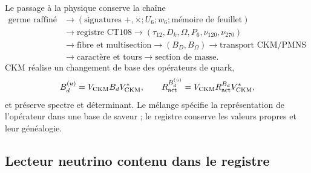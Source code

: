 Le passage à la physique conserve la chaîne
\begin{equation}
 \begin{aligned}
 \text{germe raffiné}
 &\longrightarrow(\text{signatures }+,\times;U_6;w_6;
                   \text{mémoire de feuillet})\\
 &\longrightarrow\text{registre CT108}
 \longrightarrow(\tau_{12},D_k,\Omega,P_6,\nu_{120},\nu_{270})\\
 &\longrightarrow\text{fibre et multisection}
 \longrightarrow(B_D,B_\Omega)
 \longrightarrow\text{transport CKM/PMNS}\\
 &\longrightarrow\text{caractère et tours}
 \longrightarrow\text{section de masse}.
 \end{aligned}
 \label{eq:cadena-semilla-mezcla-masa-autonoma}
\end{equation}
CKM réalise un changement de base des opérateurs de quark,
\begin{equation}
 B_d^{(u)}=V_{\rm CKM}B_dV_{\rm CKM}^*,
 \qquad
 R_{\rm act}^{B_d^{(u)}}
 =V_{\rm CKM}R_{\rm act}^{B_d}V_{\rm CKM}^*,
 \label{eq:ckm-transporte-semillas-autonoma}
\end{equation}
et préserve spectre et déterminant. Le mélange spécifie la représentation
de l'opérateur dans une base de saveur ; le registre conserve les valeurs propres et leur
généalogie.

\subsection{Lecteur neutrino contenu dans le registre}

